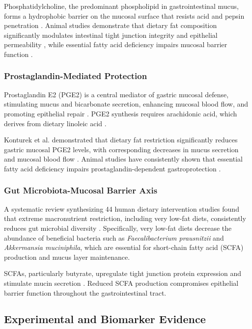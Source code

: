\documentclass[review]{elsarticle}
\begin{document}
Phosphatidylcholine, the predominant phospholipid in gastrointestinal mucus, forms a hydrophobic barrier on the mucosal surface that resists acid and pepsin penetration \cite{hills1983,lichtenberger1995}. Animal studies demonstrate that dietary fat composition significantly modulates intestinal tight junction integrity and epithelial permeability \cite{kirpich2012}, while essential fatty acid deficiency impairs mucosal barrier function \cite{hollander1991}.

\subsubsection{Prostaglandin-Mediated Protection}

Prostaglandin E2 (PGE2) is a central mediator of gastric mucosal defense, stimulating mucus and bicarbonate secretion, enhancing mucosal blood flow, and promoting epithelial repair \cite{wallace2008}. PGE2 synthesis requires arachidonic acid, which derives from dietary linoleic acid \cite{calder2015}.

Konturek et al. demonstrated that dietary fat restriction significantly reduces gastric mucosal PGE2 levels, with corresponding decreases in mucus secretion and mucosal blood flow \cite{konturek1991}. Animal studies have consistently shown that essential fatty acid deficiency impairs prostaglandin-dependent gastroprotection \cite{schepp1988}.

\subsubsection{Gut Microbiota-Mucosal Barrier Axis}

A systematic review synthesizing 44 human dietary intervention studies found that extreme macronutrient restriction, including very low-fat diets, consistently reduces gut microbial diversity \cite{wolters2019}. Specifically, very low-fat diets decrease the abundance of beneficial bacteria such as \textit{Faecalibacterium prausnitzii} and \textit{Akkermansia muciniphila}, which are essential for short-chain fatty acid (SCFA) production and mucus layer maintenance.

SCFAs, particularly butyrate, upregulate tight junction protein expression and stimulate mucin secretion \cite{peng2009,willemsen2003}. Reduced SCFA production compromises epithelial barrier function throughout the gastrointestinal tract.

\subsection{Experimental and Biomarker Evidence}
\end{document}
